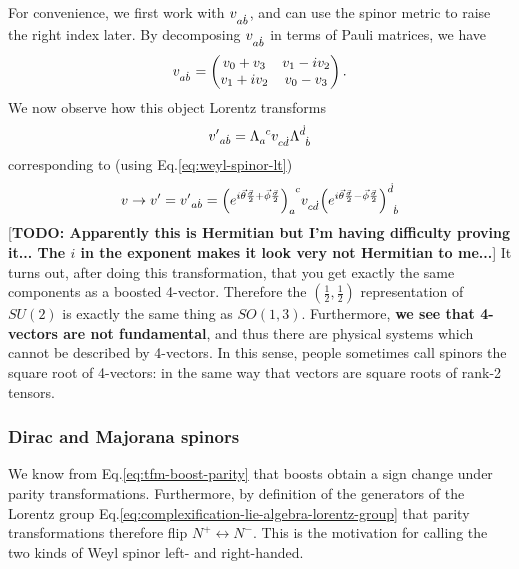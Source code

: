 \documentclass[11pt]{article}
\numberwithin{equation}{section}
\newcommand{\tn}[2]{\tensor{#1}{#2}}
\begin{document}
For convenience, we first work with $\tn{v}{_a_{\dot{b}}}$, and can use the spinor metric to raise the right index later. By decomposing $\tn{v}{_a_{\dot{b}}}$ in terms of Pauli matrices, we have
\begin{equation}
\tn{v}{_a_{\dot{b}}} = \begin{pmatrix}
v_0 + v_3 & v_1 - i v_2 \\
v_1 + i v_2 & v_0 - v_3
\end{pmatrix}.
\end{equation}
We now observe how this object Lorentz transforms
\begin{equation}
\tn{{v'}}{_a_{\dot{b}}} = \tn{\Lambda}{_a^c} \tn{{v}}{_c_{\dot{d}}} \tn{\Lambda}{^{\dot{d}}_{\dot{b}}}
\end{equation}
corresponding to (using Eq.\eqref{eq:weyl-spinor-lt})
\begin{equation}
v \rightarrow v' = \tn{{v'}}{_a_{\dot{b}}} = \tn{{\left(e^{i \vec{\theta} \frac{\vec{\sigma}}{2} + \vec{\phi} \frac{\vec{\sigma}}{2}} \right)}}{_a^c} \tn{v}{_c_{\dot{d}}} \tn{{\left(e^{i \vec{\theta} \frac{\vec{\sigma}}{2} - \vec{\phi} \frac{\vec{\sigma}}{2}} \right)}}{^{\dot{d}}_{\dot{b}}} 
\end{equation}
[\textbf{TODO: Apparently this is Hermitian but I'm having difficulty proving it... The $i$ in the exponent makes it look very not Hermitian to me...}] It turns out, after doing this transformation, that you get exactly the same components as a boosted 4-vector. Therefore the $(\frac{1}{2},\frac{1}{2})$ representation of $SU(2)$ is exactly the same thing as $SO(1,3)$. Furthermore, \textbf{we see that 4-vectors are not fundamental}, and thus there are physical systems which cannot be described by 4-vectors. In this sense, people sometimes call spinors the square root of 4-vectors: in the same way that vectors are square roots of rank-2 tensors.

\subsubsection{Dirac and Majorana spinors}
We know from Eq.\eqref{eq:tfm-boost-parity} that boosts obtain a sign change under parity transformations. Furthermore, by definition of the generators of the Lorentz group Eq.\eqref{eq:complexification-lie-algebra-lorentz-group} that parity transformations therefore flip $N^+ \leftrightarrow N^-$. This is the motivation for calling the two kinds of Weyl spinor left- and right-handed.
\end{document}
